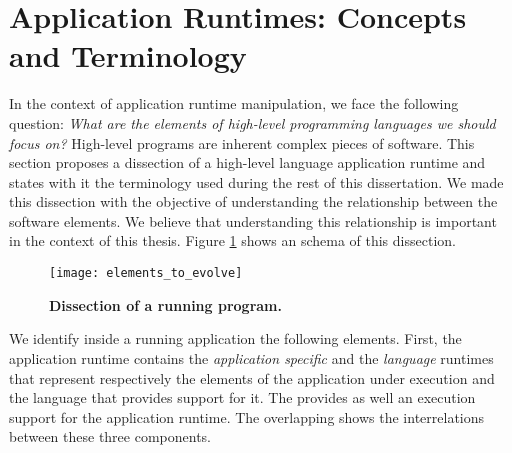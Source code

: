


\section{Application Runtimes: Concepts and Terminology}

In the context of application runtime manipulation, we face the following question: \emph{What are the elements of high-level programming languages we should focus on?} High-level programs are inherent complex pieces of software. 
This section proposes a dissection of a high-level language application runtime and states with it the terminology used during the rest of this dissertation. We made this dissection with the objective of understanding the relationship between the software elements. We believe that understanding this relationship is important in the context of this thesis. Figure \ref{fig:whatToEvolve} shows an schema of this dissection.

\begin{figure}[!ht]
\begin{center}
\texttt{[image: elements\_to\_evolve]}
\caption{\textbf{Dissection of a running program.}\label{fig:whatToEvolve} }
\end{center}
\end{figure}

We identify inside a running application the following elements. First, the application runtime contains the \emph{application specific} and the \emph{language} runtimes that represent respectively the elements of the application under execution and the language that provides support for it. The \VM provides as well an execution support for the application runtime. The overlapping shows the interrelations between these three components. 

